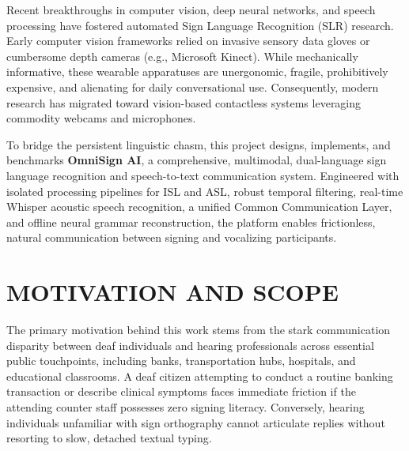 \documentclass[12pt,a4paper]{report}
\begin{document}
Recent breakthroughs in computer vision, deep neural networks, and speech processing have fostered automated Sign Language Recognition (SLR) research. Early computer vision frameworks relied on invasive sensory data gloves or cumbersome depth cameras (e.g., Microsoft Kinect). While mechanically informative, these wearable apparatuses are unergonomic, fragile, prohibitively expensive, and alienating for daily conversational use. Consequently, modern research has migrated toward vision-based contactless systems leveraging commodity webcams and microphones. 

To bridge the persistent linguistic chasm, this project designs, implements, and benchmarks \textbf{OmniSign AI}, a comprehensive, multimodal, dual-language sign language recognition and speech-to-text communication system. Engineered with isolated processing pipelines for ISL and ASL, robust temporal filtering, real-time Whisper acoustic speech recognition, a unified Common Communication Layer, and offline neural grammar reconstruction, the platform enables frictionless, natural communication between signing and vocalizing participants.

\section{MOTIVATION AND SCOPE} \label{sec:intro-scope}
The primary motivation behind this work stems from the stark communication disparity between deaf individuals and hearing professionals across essential public touchpoints, including banks, transportation hubs, hospitals, and educational classrooms. A deaf citizen attempting to conduct a routine banking transaction or describe clinical symptoms faces immediate friction if the attending counter staff possesses zero signing literacy. Conversely, hearing individuals unfamiliar with sign orthography cannot articulate replies without resorting to slow, detached textual typing.
\end{document}
